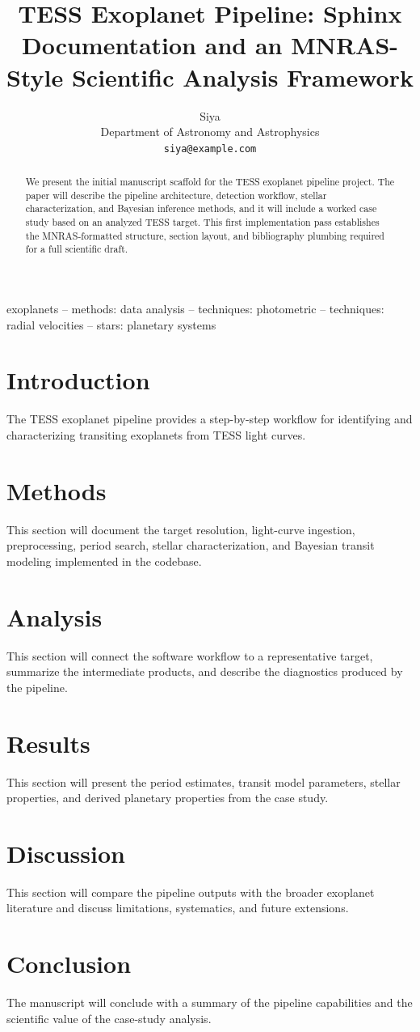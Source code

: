 \documentclass[fleqn,usenatbib]{mnras}
\title[TESS Exoplanet Pipeline]{TESS Exoplanet Pipeline: Sphinx Documentation and an MNRAS-Style Scientific Analysis Framework}
\author[Siya]{Siya\\
Department of Astronomy and Astrophysics\\
\texttt{siya@example.com}}
\begin{document}
\maketitle

\begin{abstract}
We present the initial manuscript scaffold for the TESS exoplanet pipeline project. The paper will describe the pipeline architecture, detection workflow, stellar characterization, and Bayesian inference methods, and it will include a worked case study based on an analyzed TESS target. This first implementation pass establishes the MNRAS-formatted structure, section layout, and bibliography plumbing required for a full scientific draft.
\end{abstract}

\begin{keywords}
exoplanets -- methods: data analysis -- techniques: photometric -- techniques: radial velocities -- stars: planetary systems
\end{keywords}

\section{Introduction}
The TESS exoplanet pipeline provides a step-by-step workflow for identifying and characterizing transiting exoplanets from TESS light curves.

\section{Methods}
This section will document the target resolution, light-curve ingestion, preprocessing, period search, stellar characterization, and Bayesian transit modeling implemented in the codebase.

\section{Analysis}
This section will connect the software workflow to a representative target, summarize the intermediate products, and describe the diagnostics produced by the pipeline.

\section{Results}
This section will present the period estimates, transit model parameters, stellar properties, and derived planetary properties from the case study.

\section{Discussion}
This section will compare the pipeline outputs with the broader exoplanet literature and discuss limitations, systematics, and future extensions.

\section{Conclusion}
The manuscript will conclude with a summary of the pipeline capabilities and the scientific value of the case-study analysis.



\end{document}
